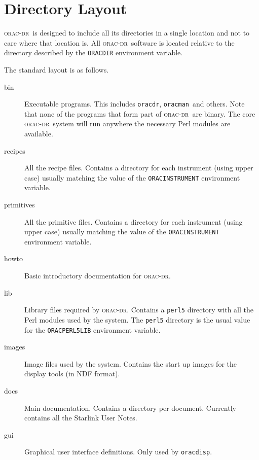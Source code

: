\documentclass[twoside,11pt]{article}
\renewcommand{\_}{\texttt{\symbol{95}}}
\newcommand{\Oracdr}{\textsc{orac-dr}}
\newcommand{\oracdr}{\texttt{oracdr}}
\newcommand{\oracman}{\texttt{oracman}}
\newcommand{\oracdisp}{\texttt{oracdisp}}
\begin{document}
\appendix

\section{Directory Layout}

\Oracdr\ is designed to include all its directories in a single
location and not to care where that location is. All \Oracdr\ software
is located relative to the directory described by  the \texttt{ORAC\_DIR}
environment variable.

The standard layout is as follows.

\begin{description}

\item[bin] \mbox{}

Executable programs. This includes \oracdr, \oracman\ and others. Note
that none of the programs that form part of \Oracdr\ are binary. 
The core \Oracdr\ system will run anywhere the necessary Perl modules
are available.

\item[recipes] \mbox{}

All the recipe files. Contains a directory for each instrument (using
upper case) usually matching the value of the
\texttt{ORAC\_INSTRUMENT} environment variable.

\item[primitives] \mbox{}

All the primitive files. Contains a directory for each instrument
(using upper case) usually matching the value of the
\texttt{ORAC\_INSTRUMENT} environment variable.

\item[howto] \mbox{}

Basic introductory documentation for \Oracdr.

\item[lib] \mbox{}

Library files required by \Oracdr. Contains a \texttt{perl5} directory
with all the Perl modules used by the system. The \texttt{perl5}
directory is the usual value for the \texttt{ORAC\_PERL5LIB}
environment variable.

\item[images] \mbox{}

Image files used by the system. Contains the start up images for the
display tools (in NDF format).

\item[docs] \mbox{}

Main documentation. Contains a directory per document. Currently
contains all the Starlink User Notes.

\item[gui] \mbox{}

Graphical user interface definitions. Only used by \oracdisp.

\end{description}
\end{document}
